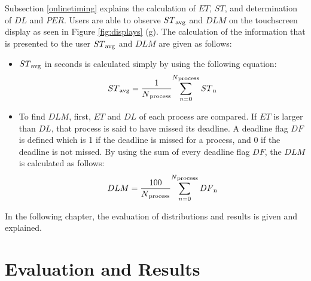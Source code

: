 Subsection \ref{onlinetiming} explains the calculation of ${ET}$, ${ST}$, and determination of ${DL}$ and ${PER}$. Users are able to observe ${ST\textsubscript{avg}}$ and ${DLM}$ on the touchscreen display as seen in Figure \ref{fig:displays} (g). The calculation of the information that is presented to the user ${ST\textsubscript{avg}}$ and ${DLM}$ are given as follows:

\begin{itemize}
	\item ${ST\textsubscript{avg}}$ in seconds is calculated simply by using the following equation:
	\begin{equation}
	ST\textsubscript{avg} =  {\frac{1}{N\textsubscript{process}}} {\sum_{n=0}^{N\textsubscript{process}} ST\textsubscript{n}} 
	\end{equation}
	\item To find ${DLM}$, first, ${ET}$ and ${DL}$ of each process are compared. If ${ET}$ is larger than ${DL}$, that process is said to have missed its deadline. A deadline flag ${DF}$ is defined which is 1 if the deadline is missed for a process, and 0 if the deadline is not missed. By using the sum of every deadline flag ${DF}$, the ${DLM}$ is calculated as follows:
	\begin{equation}
	DLM =  {\frac{100}{N\textsubscript{process}}} {\sum_{n=0}^{N\textsubscript{process}} DF\textsubscript{n}} 
	\end{equation}
\end{itemize}
In the following chapter, the evaluation of distributions and results is given and explained.

\chapter{Evaluation and Results}\label{evaluationchapter}
